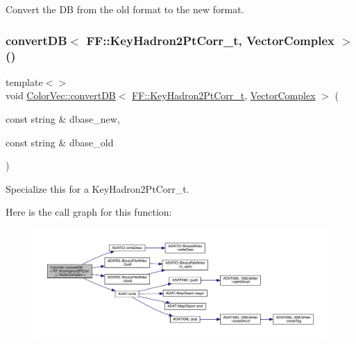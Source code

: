 Convert the DB from the old format to the new format. 

\mbox{\label{namespaceColorVec_a40c0262c4744b8e12e14737776edb8a9}} 
\subsubsection{\texorpdfstring{convertDB$<$ FF::KeyHadron2PtCorr\_t, VectorComplex $>$()}{convertDB< FF::KeyHadron2PtCorr\_t, VectorComplex >()}}
{\footnotesize\ttfamily template$<$$>$ \\
void \mbox{\hyperlink{namespaceColorVec_a2de43a353cb0439d273dacf739397303}{Color\+Vec\+::convert\+DB}}$<$ \mbox{\hyperlink{structFF_1_1KeyHadron2PtCorr__t}{F\+F\+::\+Key\+Hadron2\+Pt\+Corr\+\_\+t}}, \mbox{\hyperlink{group__defs_gab151d837d71acacce0e1c38e91e04fa3}{Vector\+Complex}} $>$ (\begin{DoxyParamCaption}\item[{const string \&}]{dbase\+\_\+new,  }\item[{const string \&}]{dbase\+\_\+old }\end{DoxyParamCaption})}



Specialize this for a Key\+Hadron2\+Pt\+Corr\+\_\+t. 

Here is the call graph for this function\+:\nopagebreak
\begin{figure}[H]
\begin{center}
\leavevmode
\includegraphics[width=350pt]{d4/d60/namespaceColorVec_a40c0262c4744b8e12e14737776edb8a9_cgraph}
\end{center}
\end{figure}
